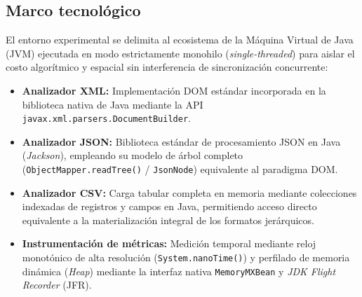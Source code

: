 \subsection{Marco tecnológico}

El entorno experimental se delimita al ecosistema de la Máquina Virtual de Java (JVM) ejecutada en modo estrictamente monohilo (\textit{single-threaded}) para aislar el costo algorítmico y espacial sin interferencia de sincronización concurrente:

\begin{itemize}
    \item \textbf{Analizador XML:} Implementación DOM estándar incorporada en la biblioteca nativa de Java mediante la API \texttt{javax.xml.parsers.DocumentBuilder}.
    \item \textbf{Analizador JSON:} Biblioteca estándar de procesamiento JSON en Java (\textit{Jackson}), empleando su modelo de árbol completo (\texttt{ObjectMapper.readTree()} / \texttt{JsonNode}) equivalente al paradigma DOM.
    \item \textbf{Analizador CSV:} Carga tabular completa en memoria mediante colecciones indexadas de registros y campos en Java, permitiendo acceso directo equivalente a la materialización integral de los formatos jerárquicos.
    \item \textbf{Instrumentación de métricas:} Medición temporal mediante reloj monotónico de alta resolución (\texttt{System.nanoTime()}) y perfilado de memoria dinámica (\textit{Heap}) mediante la interfaz nativa \texttt{MemoryMXBean} y \textit{JDK Flight Recorder} (JFR).
\end{itemize}